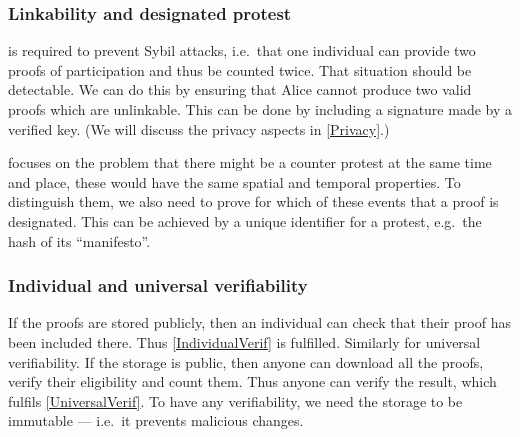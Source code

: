 \subsubsection{Linkability and designated protest}

 is required to prevent Sybil attacks, i.e.\ that one 
individual can provide two proofs of participation and thus be counted twice.
That situation should be detectable.
We can do this by ensuring that Alice cannot produce two valid proofs which
are unlinkable.
This can be done by including a signature made by a verified key.
(We will discuss the privacy aspects in \cref{Privacy}.)

 focuses on the problem that there might be a counter 
protest at the same time and place, these would have the same spatial and 
temporal properties.
To distinguish them, we also need to prove for which of these events that a 
proof is designated.
This can be achieved by a unique identifier for a protest, e.g.\ the hash of 
its \enquote{manifesto}.


\subsubsection{Individual and universal verifiability}

If the proofs are stored publicly, then an individual can check that their 
proof has been included there.
Thus \cref{IndividualVerif} is fulfilled.
Similarly for universal verifiability.
If the storage is public, then anyone can download all the proofs, verify their 
eligibility and count them.
Thus anyone can verify the result, which fulfils \cref{UniversalVerif}.
To have any verifiability, we need the storage to be immutable --- i.e.\ it 
prevents malicious changes.

